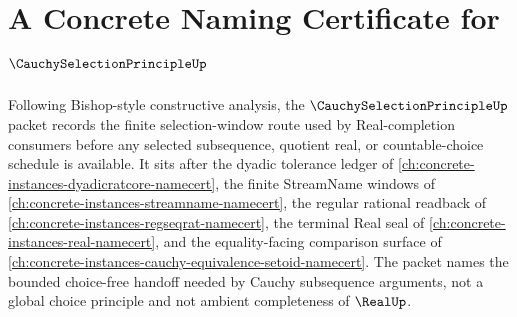 \chapter{A Concrete Naming Certificate for $\CauchySelectionPrincipleUp$}
\label{ch:concrete-instances-cauchy-selection-principle-namecert}

Following Bishop-style constructive analysis, the $\CauchySelectionPrincipleUp$ packet records the finite selection-window route used by Real-completion consumers before any selected subsequence, quotient real, or countable-choice schedule is available. It sits after the dyadic tolerance ledger of \autoref{ch:concrete-instances-dyadicratcore-namecert}, the finite StreamName windows of \autoref{ch:concrete-instances-streamname-namecert}, the regular rational readback of \autoref{ch:concrete-instances-regseqrat-namecert}, the terminal Real seal of \autoref{ch:concrete-instances-real-namecert}, and the equality-facing comparison surface of \autoref{ch:concrete-instances-cauchy-equivalence-setoid-namecert}. The packet names the bounded choice-free handoff needed by Cauchy subsequence arguments, not a global choice principle and not ambient completeness of $\RealUp$.

